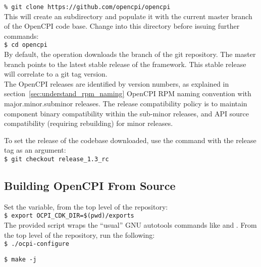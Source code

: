 \begin{appendices}
\verb+% git clone https://github.com/opencpi/opencpi+\\

This will create an  subdirectory and populate it with the current master branch of the OpenCPI code base. Change into this directory before issuing further commands:\\

\verb+$ cd opencpi+\\

By default, the  operation downloads the  branch of the git repository. The master branch points to the latest stable release of the framework. This stable release will correlate to a git tag version.\\

The OpenCPI releases are identified by version numbers, as explained in section~\ref{sec:understand_rpm_naming} OpenCPI RPM naming convention with major.minor.subminor releases. The release compatibility policy is to maintain component binary compatibility within the sub-minor releases, and API source compatibility (requiring rebuilding) for minor releases.

To set the release of the codebase downloaded, use the  command with the release tag as an argument:\\

\verb+$ git checkout release_1.3_rc+\\

\subsection{Building OpenCPI From Source}
Set the  variable, from the top level of the repository:\\

\verb+$ export OCPI_CDK_DIR=$(pwd)/exports+\\

The provided  script wraps the ``usual'' GNU autotools commands like  and . From the top level of the repository, run the following:\\

\verb+$ ./ocpi-configure+

\verb+$ make -j+\\


\end{appendices}
